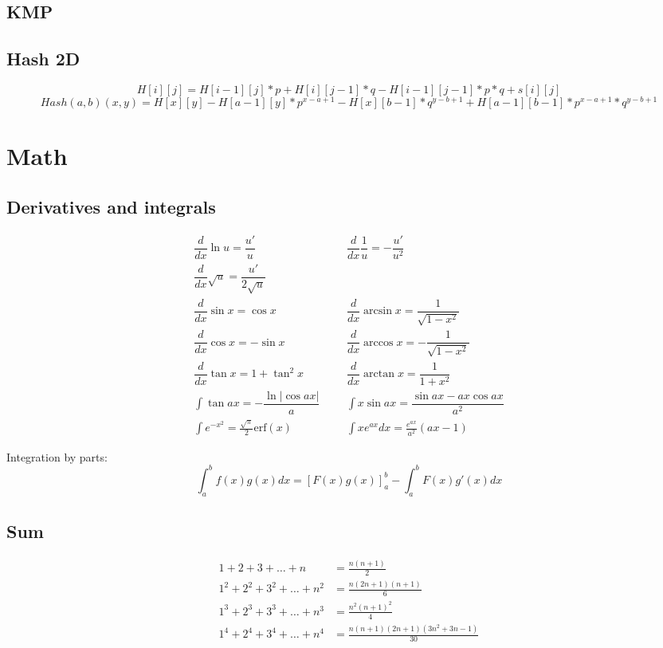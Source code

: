 \documentclass[A4 paper, 12pt, oneside]{article}
\begin{document}
\begin{multicols}{2}
	\subsection{KMP}
	
	
	\subsection{Hash 2D}
	\begin{dmath}
	H[i][j] = H[i - 1][j] * p + H[i][j - 1] * q - H[i - 1][j - 1] * p * q + s[i][j]
	\end{dmath}
	\begin{dmath}
	Hash(a,b)(x,y) = H[x][y] - H[a - 1][y]*p^{x - a + 1} - H[x][b - 1]*q^{y - b + 1} + H[a - 1][b - 1] * p^{x - a + 1} * q^{y - b + 1}
	\end{dmath}

\section{Math}	
	\subsection{Derivatives and integrals}
	\begin{align*}
        \dfrac{d}{dx}\ln{u} = \dfrac{u'}{u} &&& \dfrac{d}{dx}\dfrac{1}{u} = -\dfrac{u'}{u^2} \\
    	\dfrac{d}{dx}\sqrt u = \dfrac{u'}{2\sqrt u} \\
    	\dfrac{d}{dx}\sin x = \cos x &&& \dfrac{d}{dx}\arcsin x = \dfrac{1}{\sqrt{1-x^2}} \\ 
    	\dfrac{d}{dx}\cos x = -\sin x &&& \dfrac{d}{dx}\arccos x = -\dfrac{1}{\sqrt{1-x^2}} \\
    	\dfrac{d}{dx}\tan x = 1+\tan^2 x &&& \dfrac{d}{dx}\arctan x = \dfrac{1}{1+x^2} \\
    	\int\tan ax = -\dfrac{\ln|\cos ax|}{a} &&& \int x\sin ax = \dfrac{\sin ax-ax \cos ax}{a^2} \\
    	\int e^{-x^2} = \frac{\sqrt \pi}{2} \text{erf}(x) &&& \int xe^{ax}dx = \frac{e^{ax}}{a^2}(ax-1)
	\end{align*}

    Integration by parts:
    \[\int_a^bf(x)g(x)dx = [F(x)g(x)]_a^b-\int_a^bF(x)g'(x)dx\]	
	
	\subsection{Sum}
	\begin{align*}
    	1 + 2 + 3 + \dots + n &= \frac{n(n+1)}{2} \\
    	1^2 + 2^2 + 3^2 + \dots + n^2 &= \frac{n(2n+1)(n+1)}{6} \\
    	1^3 + 2^3 + 3^3 + \dots + n^3 &= \frac{n^2(n+1)^2}{4} \\
    	1^4 + 2^4 + 3^4 + \dots + n^4 &= \frac{n(n+1)(2n+1)(3n^2 + 3n - 1)}{30} \\
    \end{align*}
    

\end{multicols}
\end{document}
